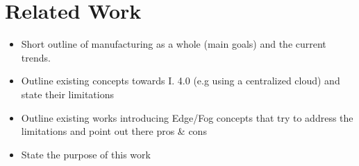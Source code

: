 \section{Related Work}\label{sec:relatedwork}

\begin{itemize}
\item Short outline of manufacturing as a whole (main goals) and the current trends.
\item Outline existing concepts towards I. 4.0 (e.g using a centralized cloud) and state their limitations
\item Outline existing works introducing Edge/Fog concepts that try to address the limitations and point out there pros \& cons
\item State the purpose of this work 
\end{itemize}